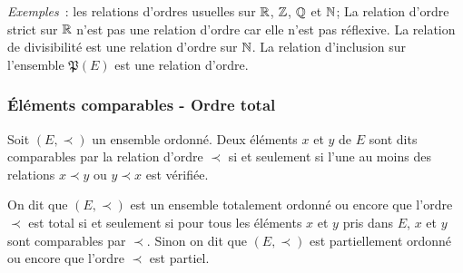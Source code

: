 \emph{Exemples}~: les relations d'ordres usuelles sur $\mathbb{R}$, $\mathbb{Z}$, $\mathbb{Q}$ et $\mathbb{N}$; La relation d'ordre strict sur $\mathbb{R}$ n'est pas une relation d'ordre car elle n'est pas réflexive. La relation de divisibilité est une relation d'ordre sur $\mathbb{N}$. La relation d'inclusion sur l'ensemble $\mathfrak{P}(E)$ est une relation d'ordre.
%
\subsubsection{Éléments comparables - Ordre total}
\label{chap3-subsubsec:ordretotal}
\begin{defdef}
Soit $(E, \prec)$ un ensemble ordonné. Deux éléments $x$ et $y$ de $E$ sont dits comparables par la relation d'ordre $\prec$ si et seulement si l'une au moins des relations $x \prec y$ ou $y \prec x$ est vérifiée.
\end{defdef}
\begin{defdef}
On dit que $(E, \prec)$ est un ensemble totalement ordonné ou encore que l'ordre $\prec$ est total si et seulement si pour tous les éléments $x$ et $y$ pris dans $E$, $x$ et $y$ sont comparables par $\prec$. Sinon on dit que $(E,\prec)$ est partiellement ordonné ou encore que l'ordre $\prec$ est partiel.
\end{defdef}
%

